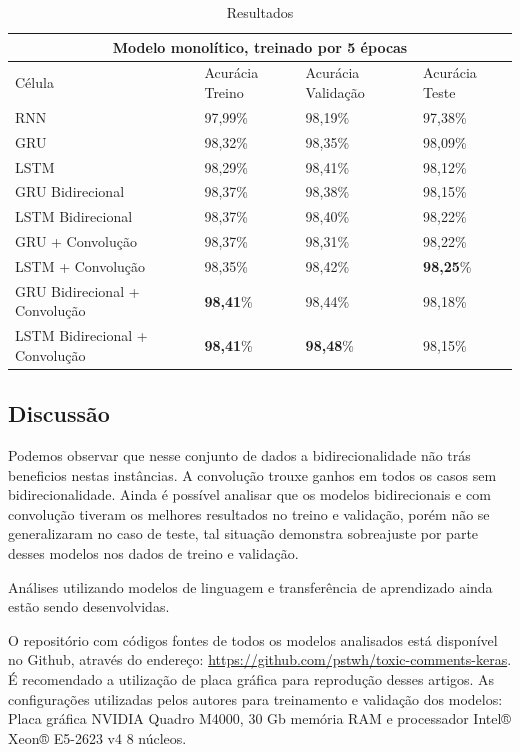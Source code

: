 \documentclass[12pt]{article}
\begin{document}
\begin{table}[!htb]
  \small
  \centering
  \renewcommand{\arraystretch}{1.15}
  \begin{tabular}{llll}
      \hline
      \multicolumn{4}{c}{Modelo monolítico, treinado por 5 épocas} \\
      \hline
    \hline
     Célula & Acurácia Treino & Acurácia Validação & Acurácia Teste \\
    RNN & 97,99\% & 98,19\% & 97,38\% \\
    GRU & 98,32\% & 98,35\% & 98,09\% \\
    LSTM & 98,29\% & 98,41\% & 98,12\% \\
    GRU Bidirecional & 98,37\% & 98,38\% & 98,15\% \\
    LSTM Bidirecional & 98,37\% & 98,40\% & 98,22\% \\
    GRU + Convolução & 98,37\% & 98,31\% & 98,22\% \\
    LSTM + Convolução & 98,35\% & 98,42\% & \textbf{98,25}\% \\
    GRU Bidirecional + Convolução & \textbf{98,41}\% & 98,44\% & 98,18\% \\
    LSTM Bidirecional + Convolução & \textbf{98,41}\% & \textbf{98,48}\% & 98,15\% \\
    \hline
  \end{tabular}
  \caption{Resultados}
  \label{tab:ptb}
\end{table}

\subsection{Discussão}

Podemos observar que nesse conjunto de dados a bidirecionalidade não trás beneficios nestas instâncias. A convolução trouxe ganhos em todos os casos sem bidirecionalidade. Ainda é possível analisar que os modelos bidirecionais e com convolução tiveram os melhores resultados no treino e validação, porém não se generalizaram no caso de teste, tal situação demonstra sobreajuste por parte desses modelos nos dados de treino e validação.

Análises utilizando modelos de linguagem e transferência de aprendizado ainda estão sendo desenvolvidas.

O repositório com códigos fontes de todos os modelos analisados está disponível no Github, através do endereço: \url{https://github.com/pstwh/toxic-comments-keras}. É recomendado a utilização de placa gráfica para reprodução desses artigos. As configurações utilizadas pelos autores para treinamento e validação dos modelos: Placa gráfica NVIDIA Quadro M4000, 30 Gb memória RAM e processador Intel® Xeon® E5-2623 v4 8 núcleos.
\end{document}
